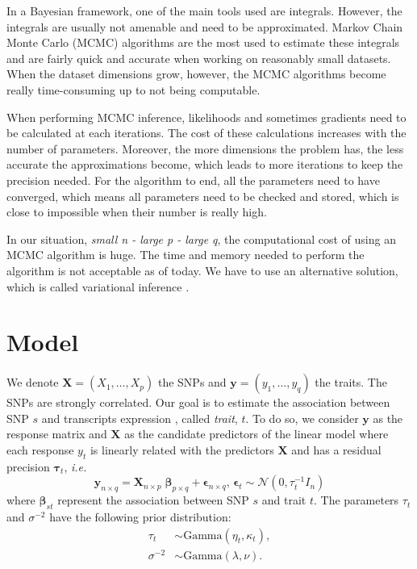 \documentclass{article}
\numberwithin{equation}{section}
\begin{document}
In a Bayesian framework, one of the main tools used are integrals. However, the integrals are usually not amenable and need to be approximated. Markov Chain Monte Carlo (MCMC) algorithms are the most used to estimate these integrals and are fairly quick and accurate when working on reasonably small datasets. When the dataset dimensions grow, however, the MCMC algorithms become really time-consuming up to not being computable.

When performing MCMC inference, likelihoods and sometimes gradients need to be calculated at each iterations. The cost of these calculations increases with the number of parameters. Moreover, the more dimensions the problem has, the less accurate the approximations become, which leads to more iterations to keep the precision needed. For the algorithm to end, all the parameters need to have converged, which means all parameters need to be checked and stored, which is close to impossible when their number is really high.

In our situation, \textit{small n - large p - large q}, the computational cost of using an MCMC algorithm is huge. The time and memory needed to perform the algorithm is not acceptable as of today. We have to use an alternative solution, which is called variational inference \cite{varInf}.
\newpage
\section{Model}
We denote $\boldsymbol{X }= (X_1,\ldots,X_p)$ the SNPs and $\boldsymbol{y} = (y_1,\ldots,y_q)$ the traits. The SNPs are strongly correlated. Our goal is to estimate the association between SNP $s$ and transcripts expression , called \textit{trait}, $t$. To do so, we consider $\boldsymbol{y}$ as the response matrix and $\boldsymbol{X}$ as the candidate predictors of the linear model where each response $y_t$ is linearly related with the predictors $\boldsymbol{X}$ and has a residual precision $\boldsymbol{\tau}_t$, \textit{i.e.}
\begin{equation*}
\label{eq:model}
\boldsymbol{y}_{n\times q} = \boldsymbol{X}_{n \times p}\;\boldsymbol{\beta}_{p \times q}+\boldsymbol{\epsilon}_{n \times q}\text{, }\boldsymbol{\epsilon}_t \sim \mathcal{N}(0,\tau_t^{-1}I_n)
\end{equation*}
where $\boldsymbol{\beta}_{st}$ represent the association between SNP $s$ and trait $t$. The parameters $\tau_t$ and $\sigma^{-2}$ have the following prior distribution:
\begin{align*}
\tau_t &\sim \text{Gamma}(\eta_t,\kappa_t),\\
\sigma^{-2} &\sim \text{Gamma}(\lambda,\nu).
\end{align*}
\end{document}
